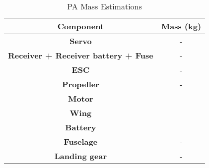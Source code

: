\begin{table}[H]
\centering
    \begin{tabular}{@{}cc@{}}
    \toprule
    \textbf{Component}                          & \textbf{Mass (kg)} \\ \midrule
    \textbf{Servo}                              & -               \\
    \textbf{Receiver + Receiver battery + Fuse} & -               \\
    \textbf{ESC}                                & -               \\
    \textbf{Propeller}                          & -               \\
    \textbf{Motor}                              &                    \\
    \textbf{Wing}                               &                    \\
    \textbf{Battery}                            &                    \\
    \textbf{Fuselage}                           & -               \\
    \textbf{Landing gear}                       & -               \\ \bottomrule
    \end{tabular}
\caption{PA Mass Estimations}
\label{tab:pa_mass}
\end{table}
